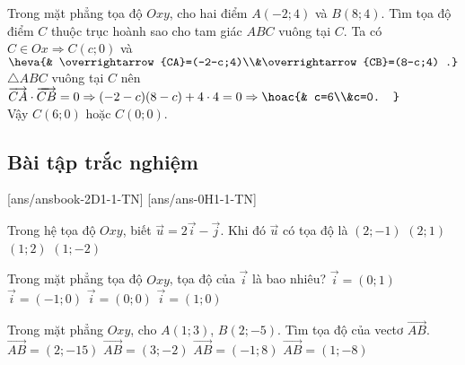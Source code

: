 \begin{bt}%
	Trong mặt phẳng tọa độ $Oxy$, cho hai điểm $A(-2;4)$ và $B(8;4)$. Tìm tọa độ điểm $C$ thuộc trục hoành sao cho tam giác $ABC$ vuông tại $C$.
	\loigiai
	{
		Ta có $C\in Ox\Rightarrow C(c;0)$ và $\heva{& \overrightarrow{CA}=(-2-c;4)\\&\overrightarrow{CB}=(8-c;4) .}$\\
		$\triangle ABC$ vuông tại $C$ nên $\overrightarrow{CA}\cdot\overrightarrow{CB}=0\Rightarrow (-2-c)(8-c)+4\cdot 4=0\Rightarrow\hoac{& c=6\\&c=0. }$\\
		Vậy $C(6;0)$ hoặc $C(0;0)$.
	}
\end{bt}

\subsection{Bài tập trắc nghiệm}
[ans/ansbook-2D1-1-TN]
[ans/ans-0H1-1-TN]
\begin{ex}%
	Trong hệ tọa độ $Oxy$, biết $\overrightarrow{u}=2\overrightarrow{i}-\overrightarrow{j}$. Khi đó $\overrightarrow{u}$ có tọa độ là
	\choice
	{\True $(2;-1)$}
	{$(2;1)$}
	{$(1;2)$}
	{$(1;-2)$}
\end{ex}
\begin{ex}%
	Trong mặt phẳng tọa độ $Oxy$, tọa độ của $\overrightarrow{i}$ là bao nhiêu?
	\choice
	{$\overrightarrow{i} = (0; 1)$}
	{$\overrightarrow{i} = (-1; 0)$}
	{$\overrightarrow{i} = (0; 0)$}
	{\True $\overrightarrow{i} = (1; 0)$}
\end{ex}
\begin{ex}%
	Trong mặt phẳng $Oxy$, cho $A(1;3)$, $B(2;-5)$. Tìm tọa độ của vectơ $\overrightarrow{AB}$.
	\choice
	{$\overrightarrow{AB}=(2;-15)$}
	{$\overrightarrow{AB}=(3;-2)$}
	{$\overrightarrow{AB}=(-1;8)$}
	{\True $\overrightarrow{AB}=(1;-8)$}
\end{ex}
